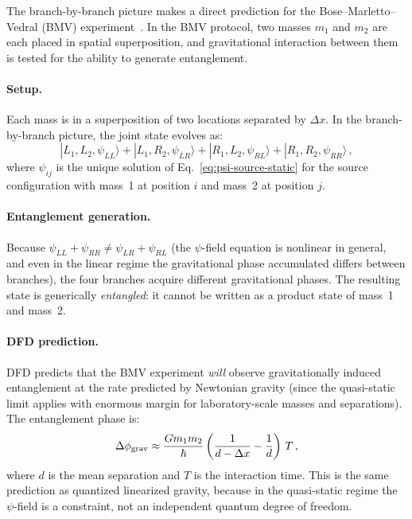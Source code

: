 The branch-by-branch picture makes a direct prediction for the Bose--Marletto--Vedral (BMV) experiment~\cite{Bose2017,MarlettoVedral2017}.  In the BMV protocol, two masses $m_1$ and $m_2$ are each placed in spatial superposition, and gravitational interaction between them is tested for the ability to generate entanglement.

\paragraph{Setup.}
Each mass is in a superposition of two locations separated by $\Delta x$.  In the branch-by-branch picture, the joint state evolves as:
\begin{equation}
|L_1, L_2, \psi_{LL}\rangle + |L_1, R_2, \psi_{LR}\rangle + |R_1, L_2, \psi_{RL}\rangle + |R_1, R_2, \psi_{RR}\rangle\,,
\end{equation}
where $\psi_{ij}$ is the unique solution of Eq.~\eqref{eq:psi-source-static} for the source configuration with mass~1 at position $i$ and mass~2 at position $j$.

\paragraph{Entanglement generation.}
Because $\psi_{LL} + \psi_{RR} \neq \psi_{LR} + \psi_{RL}$ (the $\psi$-field equation is nonlinear in general, and even in the linear regime the gravitational phase accumulated differs between branches), the four branches acquire different gravitational phases.  The resulting state is generically \emph{entangled}: it cannot be written as a product state of mass~1 and mass~2.

\paragraph{DFD prediction.}
DFD predicts that the BMV experiment \emph{will} observe gravitationally induced entanglement at the rate predicted by Newtonian gravity (since the quasi-static limit applies with enormous margin for laboratory-scale masses and separations).  The entanglement phase is:
\begin{equation}\label{eq:bmv-phase}
\Delta\phi_{\rm grav} \approx \frac{Gm_1 m_2}{\hbar}\left(\frac{1}{d - \Delta x} - \frac{1}{d}\right)\,T\,,
\end{equation}
where $d$ is the mean separation and $T$ is the interaction time.  This is the same prediction as quantized linearized gravity, because in the quasi-static regime the $\psi$-field is a constraint, not an independent quantum degree of freedom.

